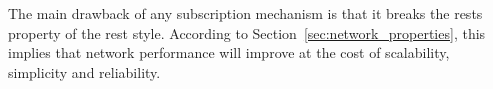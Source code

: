 The main drawback of any subscription mechanism is that it breaks the \acl{rests} property of the \ac{rest} style.
According to Section~\ref{sec:network_properties}, this implies that network performance will improve at the cost of scalability, simplicity and reliability.


% 
% 
